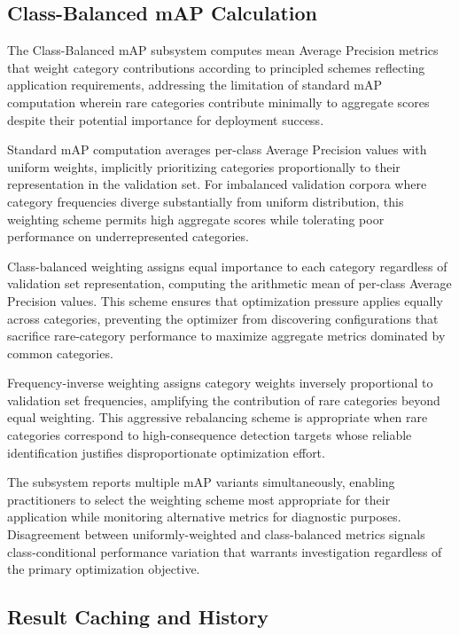 \subsection{Class-Balanced mAP Calculation}

The Class-Balanced mAP subsystem computes mean Average Precision metrics that weight category contributions according to principled schemes reflecting application requirements, addressing the limitation of standard mAP computation wherein rare categories contribute minimally to aggregate scores despite their potential importance for deployment success.

Standard mAP computation averages per-class Average Precision values with uniform weights, implicitly prioritizing categories proportionally to their representation in the validation set. For imbalanced validation corpora where category frequencies diverge substantially from uniform distribution, this weighting scheme permits high aggregate scores while tolerating poor performance on underrepresented categories.

Class-balanced weighting assigns equal importance to each category regardless of validation set representation, computing the arithmetic mean of per-class Average Precision values. This scheme ensures that optimization pressure applies equally across categories, preventing the optimizer from discovering configurations that sacrifice rare-category performance to maximize aggregate metrics dominated by common categories.

Frequency-inverse weighting assigns category weights inversely proportional to validation set frequencies, amplifying the contribution of rare categories beyond equal weighting. This aggressive rebalancing scheme is appropriate when rare categories correspond to high-consequence detection targets whose reliable identification justifies disproportionate optimization effort.

The subsystem reports multiple mAP variants simultaneously, enabling practitioners to select the weighting scheme most appropriate for their application while monitoring alternative metrics for diagnostic purposes. Disagreement between uniformly-weighted and class-balanced metrics signals class-conditional performance variation that warrants investigation regardless of the primary optimization objective.

\subsection{Result Caching and History}

